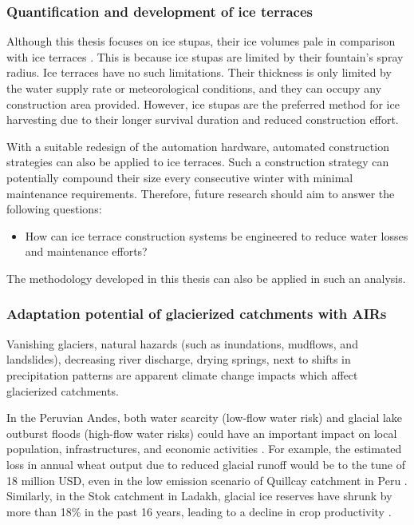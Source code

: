 \subsubsection{Quantification and development of ice terraces}

Although this thesis focuses on ice stupas, their ice volumes pale in comparison with ice terraces
\citep{nusserSociohydrologyArtificialGlaciers2019}. This is because ice stupas are limited by their fountain's
spray radius. Ice terraces have no such limitations. Their thickness is only limited by the water
supply rate or meteorological conditions, and they can occupy any construction area provided. However, ice stupas
are the preferred method for ice harvesting due to their longer survival duration and reduced construction
effort.

With a suitable redesign of the automation hardware, automated construction strategies can also be applied to
ice terraces. Such a construction strategy can potentially compound their size every consecutive winter with
minimal maintenance requirements. Therefore, future research should aim to answer the following
questions:

\begin{itemize}

	\item How can ice terrace construction systems be engineered to reduce water losses and maintenance
	      efforts?

\end{itemize}

The methodology developed in this thesis can also be applied in such an analysis.

\subsubsection{Adaptation potential of glacierized catchments with AIRs}

Vanishing glaciers, natural hazards (such as inundations, mudflows, and landslides), decreasing river discharge,
drying springs, next to shifts in precipitation patterns are apparent climate change impacts which affect
glacierized catchments.

In the Peruvian Andes, both water scarcity (low-flow water risk) and glacial lake outburst floods (high-flow
water risks) could have an important impact on local population, infrastructures, and economic activities
\citep{motschmannIntegratedAssessmentsWater2020}. For example, the estimated loss in annual wheat output due to
reduced glacial runoff would be to the tune of 18 million USD, even in the low emission scenario of Quillcay
catchment in Peru \citep{motschmannLossesDamagesConnected2020}. Similarly, in the Stok catchment in Ladakh,
glacial ice reserves have shrunk by more than 18\% in the past 16 years, leading to a decline in crop
productivity \citep{sohebSpatiotemporalQuantificationKey2022}.

